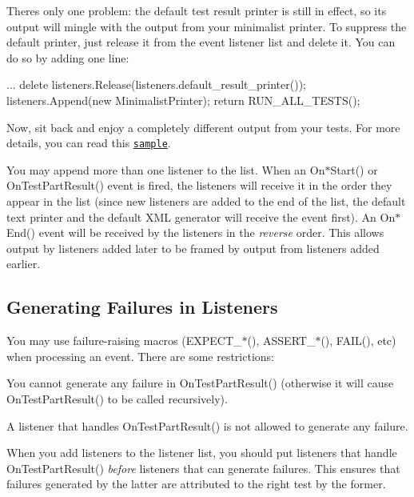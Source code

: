 There\textquotesingle{}s only one problem\+: the default test result printer is still in effect, so its output will mingle with the output from your minimalist printer. To suppress the default printer, just release it from the event listener list and delete it. You can do so by adding one line\+: 
\begin{DoxyCode}
...
delete listeners.Release(listeners.default\_result\_printer());
listeners.Append(new MinimalistPrinter);
return RUN\_ALL\_TESTS();
\end{DoxyCode}


Now, sit back and enjoy a completely different output from your tests. For more details, you can read this \href{../samples/sample9_unittest.cc}{\tt sample}.

You may append more than one listener to the list. When an {\ttfamily On$\ast$\+Start()} or {\ttfamily On\+Test\+Part\+Result()} event is fired, the listeners will receive it in the order they appear in the list (since new listeners are added to the end of the list, the default text printer and the default X\+ML generator will receive the event first). An {\ttfamily On$\ast$\+End()} event will be received by the listeners in the {\itshape reverse} order. This allows output by listeners added later to be framed by output from listeners added earlier.

\subsection*{Generating Failures in Listeners}

You may use failure-\/raising macros ({\ttfamily E\+X\+P\+E\+C\+T\+\_\+$\ast$()}, {\ttfamily A\+S\+S\+E\+R\+T\+\_\+$\ast$()}, {\ttfamily F\+A\+I\+L()}, etc) when processing an event. There are some restrictions\+:


\begin{DoxyEnumerate}
\item You cannot generate any failure in {\ttfamily On\+Test\+Part\+Result()} (otherwise it will cause {\ttfamily On\+Test\+Part\+Result()} to be called recursively).
\end{DoxyEnumerate}
\begin{DoxyEnumerate}
\item A listener that handles {\ttfamily On\+Test\+Part\+Result()} is not allowed to generate any failure.
\end{DoxyEnumerate}

When you add listeners to the listener list, you should put listeners that handle {\ttfamily On\+Test\+Part\+Result()} {\itshape before} listeners that can generate failures. This ensures that failures generated by the latter are attributed to the right test by the former.

